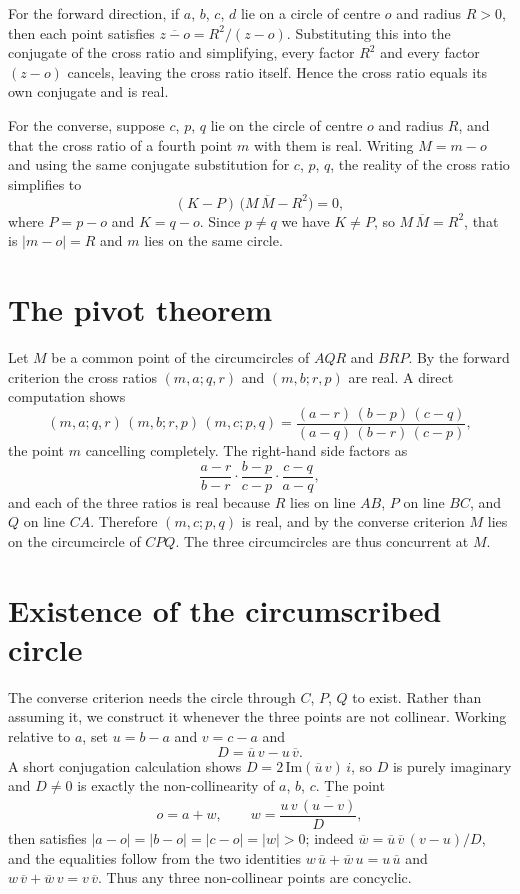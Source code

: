 \documentclass[11pt,a4paper]{article}
\begin{document}
For the forward direction, if \(a\), \(b\), \(c\), \(d\) lie on a circle of
centre \(o\) and radius \(R>0\), then each point satisfies
\(\overline{z-o} = R^{2}/(z-o)\).  Substituting this into the conjugate of the
cross ratio and simplifying, every factor \(R^{2}\) and every factor
\((z-o)\) cancels, leaving the cross ratio itself.  Hence the cross ratio
equals its own conjugate and is real.

For the converse, suppose \(c\), \(p\), \(q\) lie on the circle of centre
\(o\) and radius \(R\), and that the cross ratio of a fourth point \(m\) with
them is real.  Writing \(M = m-o\) and using the same conjugate substitution
for \(c\), \(p\), \(q\), the reality of the cross ratio simplifies to
\[
  (K - P)\,\bigl(M\,\overline{M} - R^{2}\bigr) = 0,
\]
where \(P = p-o\) and \(K = q-o\).  Since \(p \neq q\) we have \(K \neq P\),
so \(M\,\overline{M} = R^{2}\), that is \(\lvert m-o\rvert = R\) and \(m\) lies
on the same circle.

\section{The pivot theorem}

Let \(M\) be a common point of the circumcircles of \(AQR\) and \(BRP\).  By
the forward criterion the cross ratios \((m,a;q,r)\) and \((m,b;r,p)\) are
real.  A direct computation shows
\[
  (m,a;q,r)\,(m,b;r,p)\,(m,c;p,q)
    = \frac{(a-r)\,(b-p)\,(c-q)}{(a-q)\,(b-r)\,(c-p)},
\]
the point \(m\) cancelling completely.  The right-hand side factors as
\[
  \frac{a-r}{b-r}\cdot\frac{b-p}{c-p}\cdot\frac{c-q}{a-q},
\]
and each of the three ratios is real because \(R\) lies on line \(AB\), \(P\)
on line \(BC\), and \(Q\) on line \(CA\).  Therefore \((m,c;p,q)\) is real,
and by the converse criterion \(M\) lies on the circumcircle of \(CPQ\).  The
three circumcircles are thus concurrent at \(M\).

\section{Existence of the circumscribed circle}

The converse criterion needs the circle through \(C\), \(P\), \(Q\) to exist.
Rather than assuming it, we construct it whenever the three points are not
collinear.  Working relative to \(a\), set \(u = b-a\) and \(v = c-a\) and
\[
  D = \overline{u}\,v - u\,\overline{v}.
\]
A short conjugation calculation shows \(D = 2\,\mathrm{Im}(\overline{u}\,v)\,i\),
so \(D\) is purely imaginary and \(D \neq 0\) is exactly the non-collinearity
of \(a\), \(b\), \(c\).  The point
\[
  o = a + w, \qquad w = \frac{u\,v\,\overline{(u-v)}}{D},
\]
then satisfies \(\lvert a-o\rvert = \lvert b-o\rvert = \lvert c-o\rvert
= \lvert w\rvert > 0\); indeed \(\overline{w} = \overline{u}\,\overline{v}
\,(v-u)/D\), and the equalities follow from the two identities
\(w\,\overline{u} + \overline{w}\,u = u\,\overline{u}\) and
\(w\,\overline{v} + \overline{w}\,v = v\,\overline{v}\).  Thus any three
non-collinear points are concyclic.
\end{document}
